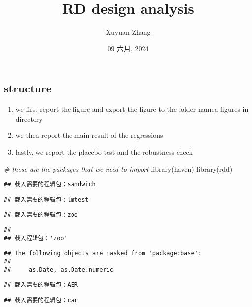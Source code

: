 \documentclass[
]{article}
\title{RD design analysis}
\author{Xuyuan Zhang}
\date{09 六月, 2024}
\newenvironment{Shaded}{\begin{snugshade}}{\end{snugshade}}
\newcommand{\CommentTok}[1]{\textcolor[rgb]{0.56,0.35,0.01}{\textit{#1}}}
\newcommand{\FunctionTok}[1]{\textcolor[rgb]{0.00,0.00,0.00}{#1}}
\newcommand{\NormalTok}[1]{#1}
\providecommand{\tightlist}{%
  \setlength{\itemsep}{0pt}\setlength{\parskip}{0pt}}
\begin{document}
\maketitle

\hypertarget{structure}{%
\subsection{structure}\label{structure}}

\begin{enumerate}
\def\labelenumi{\arabic{enumi}.}
\tightlist
\item
  we first report the figure and export the figure to the folder named
  figures in directory
\item
  we then report the main result of the regressions
\item
  lastly, we report the placebo test and the robustness check
\end{enumerate}

\begin{Shaded}
\begin{Highlighting}[]
\CommentTok{\# these are the packages that we need to import}
\FunctionTok{library}\NormalTok{(haven)}
\FunctionTok{library}\NormalTok{(rdd)}
\end{Highlighting}
\end{Shaded}

\begin{verbatim}
## 载入需要的程辑包：sandwich
\end{verbatim}

\begin{verbatim}
## 载入需要的程辑包：lmtest
\end{verbatim}

\begin{verbatim}
## 载入需要的程辑包：zoo
\end{verbatim}

\begin{verbatim}
## 
## 载入程辑包：'zoo'
\end{verbatim}

\begin{verbatim}
## The following objects are masked from 'package:base':
## 
##     as.Date, as.Date.numeric
\end{verbatim}

\begin{verbatim}
## 载入需要的程辑包：AER
\end{verbatim}

\begin{verbatim}
## 载入需要的程辑包：car
\end{verbatim}
\end{document}
